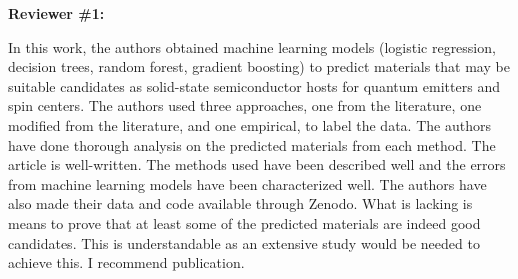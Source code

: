 \documentclass[11pt, a4paper]{letter} %
\begin{document}

\noindent
\textbf{Reviewer \#1: }

In this work, the authors obtained machine learning models (logistic regression, decision trees, random forest, gradient boosting) to predict materials that may be suitable candidates as solid-state semiconductor hosts for quantum emitters and spin centers. The authors used three approaches, one from the literature, one modified from the literature, and one empirical, to label the data. The authors have done thorough analysis on the predicted materials from each method. The article is well-written. The methods used have been described well and the errors from machine learning models have been characterized well. The authors have also made their data and code available through Zenodo. What is lacking is means to prove that at least some of the predicted materials are indeed good candidates. This is understandable as an extensive study would be needed to achieve this. I recommend publication.  
\end{document}

